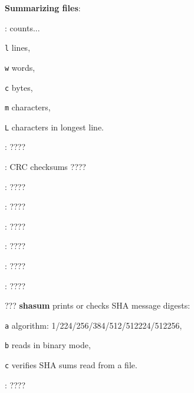 \textbf{Summarizing files}:
\begin{compactenum}
	\item [\symbolcoreutils] : counts...
	\item [\texttt{l}] lines,
	\item [\texttt{w}] words,
	\item [\texttt{c}] bytes,
	\item [\texttt{m}] characters,
	\item [\texttt{L}] characters in longest line.
	\item [\symbolcoreutils] : \dotfill ????
	\item [\symbolcoreutils] : CRC checksums \dotfill ????
	\item [\symbolcoreutils] : \dotfill ????
	\item [\symbolcoreutils] : \dotfill ????
	\item [\symbolcoreutils] : \dotfill ????
	\item [\symbolcoreutils] : \dotfill ????
	\item [\symbolcoreutils] : \dotfill ????
	\item [\symbolcoreutils] : \dotfill ????
	\item [???] \textbf{shasum} prints or checks SHA message digests:
	\item [\texttt{a}] algorithm: 1/224/256/384/512/512224/512256,
	\item [\texttt{b}] reads in binary mode,
	\item [\texttt{c}] verifies SHA sums read from a file.
	\item [\symbolcoreutils] : \dotfill ????
\end{compactenum}

